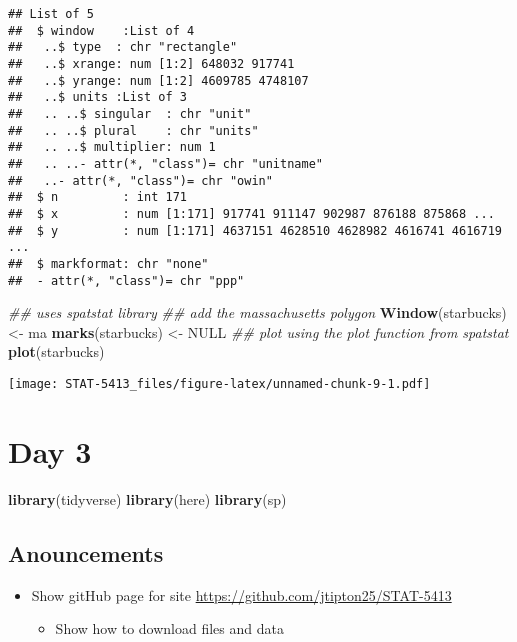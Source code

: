 \documentclass[]{book}
\newenvironment{Shaded}{\begin{snugshade}}{\end{snugshade}}
\newcommand{\CommentTok}[1]{\textcolor[rgb]{0.56,0.35,0.01}{\textit{#1}}}
\newcommand{\KeywordTok}[1]{\textcolor[rgb]{0.13,0.29,0.53}{\textbf{#1}}}
\newcommand{\NormalTok}[1]{#1}
\newcommand{\OtherTok}[1]{\textcolor[rgb]{0.56,0.35,0.01}{#1}}
\newcommand{\StringTok}[1]{\textcolor[rgb]{0.31,0.60,0.02}{#1}}
\providecommand{\tightlist}{%
  \setlength{\itemsep}{0pt}\setlength{\parskip}{0pt}}
\begin{document}
\begin{verbatim}
## List of 5
##  $ window    :List of 4
##   ..$ type  : chr "rectangle"
##   ..$ xrange: num [1:2] 648032 917741
##   ..$ yrange: num [1:2] 4609785 4748107
##   ..$ units :List of 3
##   .. ..$ singular  : chr "unit"
##   .. ..$ plural    : chr "units"
##   .. ..$ multiplier: num 1
##   .. ..- attr(*, "class")= chr "unitname"
##   ..- attr(*, "class")= chr "owin"
##  $ n         : int 171
##  $ x         : num [1:171] 917741 911147 902987 876188 875868 ...
##  $ y         : num [1:171] 4637151 4628510 4628982 4616741 4616719 ...
##  $ markformat: chr "none"
##  - attr(*, "class")= chr "ppp"
\end{verbatim}

\begin{Shaded}
\begin{Highlighting}[]
\CommentTok{## uses spatstat library}
\CommentTok{## add the massachusetts polygon}
\KeywordTok{Window}\NormalTok{(starbucks) <-}\StringTok{ }\NormalTok{ma}
\KeywordTok{marks}\NormalTok{(starbucks) <-}\StringTok{ }\OtherTok{NULL}
\CommentTok{## plot using the plot function from spatstat}
\KeywordTok{plot}\NormalTok{(starbucks)}
\end{Highlighting}
\end{Shaded}

\texttt{[image: STAT-5413\_files/figure-latex/unnamed-chunk-9-1.pdf]}

\hypertarget{day-3}{%
\chapter{Day 3}\label{day-3}}

\begin{Shaded}
\begin{Highlighting}[]
\KeywordTok{library}\NormalTok{(tidyverse)}
\KeywordTok{library}\NormalTok{(here)}
\KeywordTok{library}\NormalTok{(sp)}
\end{Highlighting}
\end{Shaded}

\hypertarget{anouncements}{%
\section{Anouncements}\label{anouncements}}

\begin{itemize}
\item
  Show gitHub page for site \url{https://github.com/jtipton25/STAT-5413}

  \begin{itemize}
  \tightlist
  \item
    Show how to download files and data
  \end{itemize}
\end{itemize}
\end{document}
